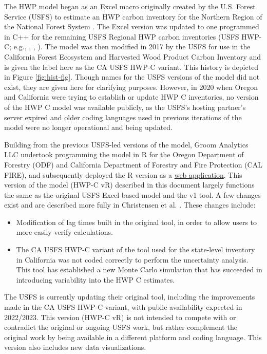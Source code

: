\documentclass[
  openany]{book}
\providecommand{\tightlist}{%
  \setlength{\itemsep}{0pt}\setlength{\parskip}{0pt}}
\begin{document}
The HWP model began as an Excel macro originally created by the U.S. Forest Service (USFS) to estimate an HWP carbon inventory for the Northern Region of the National Forest System \autocite{stockmann2012,anderson2013}. The Excel version was updated to one programmed in C++ for the remaining USFS Regional HWP carbon inventories (USFS HWP-C; e.g., \textcite{butler2014}, \textcite{loeffler2014}, \textcite{stockmann2014}). The model was then modified in 2017 by the USFS for use in the California Forest Ecosystem and Harvested Wood Product Carbon Inventory \autocite{loeffler2019} and is given the label here as the CA USFS HWP-C variant. This history is depicted in Figure \ref{fig:hist-fig}. Though names for the USFS versions of the model did not exist, they are given here for clarifying purposes. However, in 2020 when Oregon and California were trying to establish or update HWP C inventories, no version of the HWP C model was available publicly, as the USFS's hosting partner's server expired and older coding languages used in previous iterations of the model were no longer operational and being updated.

Building from the previous USFS-led versions of the model, Groom Analytics LLC undertook programming the model in R for the Oregon Department of Forestry (ODF) and California Department of Forestry and Fire Protection (CAL FIRE), and subsequently deployed the R version as a \href{https://groomanalyticsllc.shinyapps.io/HWP-C-vR/}{web application}. This version of the model (HWP-C vR) described in this document largely functions the same as the original USFS Excel-based model and the v1 tool. A few changes exist and are described more fully in Christensen et al. \autocite*{christensen2020,christensen2021}. These changes include:

\begin{itemize}
\tightlist
\item
  Modification of lag times built in the original tool, in order to allow users to more easily verify calculations.\\
\item
  The CA USFS HWP-C variant of the tool used for the state-level inventory in California was not coded correctly to perform the uncertainty analysis. This tool has established a new Monte Carlo simulation that has succeeded in introducing variability into the HWP C estimates.
\end{itemize}

The USFS is currently updating their original tool, including the improvements made in the CA USFS HWP-C variant, with public availability expected in 2022/2023. This version (HWP-C vR) is not intended to compete with or contradict the original or ongoing USFS work, but rather complement the original work by being available in a different platform and coding language. This version also includes new data visualizations.
\end{document}
